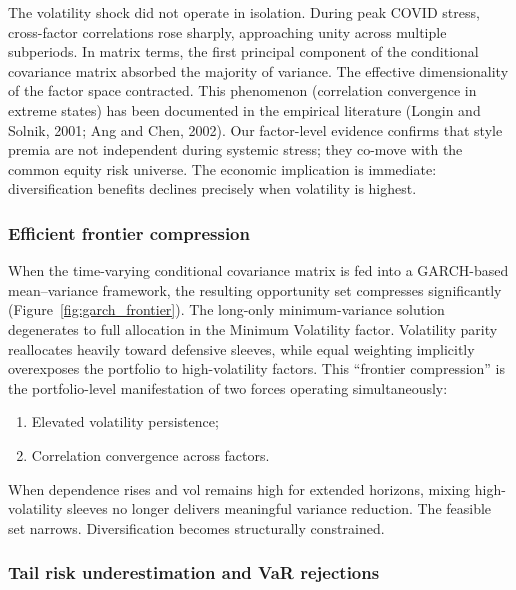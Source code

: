 \documentclass{article}
\begin{document}
The volatility shock did not operate in isolation. During peak COVID stress, cross-factor correlations rose sharply, approaching unity across multiple subperiods. In matrix terms, the first principal component of the conditional covariance matrix absorbed the majority of variance. The effective dimensionality of the factor space contracted. This phenomenon (correlation convergence in extreme states) has been documented in the empirical literature (Longin and Solnik, 2001; Ang and Chen, 2002). Our factor-level evidence confirms that style premia are not independent during systemic stress; they co-move with the common equity risk universe. The economic implication is immediate: diversification benefits declines precisely when volatility is highest.\newline

\subsubsection{Efficient frontier compression}

When the time-varying conditional covariance matrix is fed into a GARCH-based mean–variance framework, the resulting opportunity set compresses significantly (Figure~\ref{fig:garch_frontier}). The long-only minimum-variance solution degenerates to full allocation in the Minimum Volatility factor. Volatility parity reallocates heavily toward defensive sleeves, while equal weighting implicitly overexposes the portfolio to high-volatility factors. This “frontier compression” is the portfolio-level manifestation of two forces operating simultaneously:\newline

\begin{enumerate}
\item Elevated volatility persistence;
\item Correlation convergence across factors.
\end{enumerate}

When dependence rises and vol remains high for extended horizons, mixing high-volatility sleeves no longer delivers meaningful variance reduction. The feasible set narrows. Diversification becomes structurally constrained.\newline

\subsubsection{Tail risk underestimation and VaR rejections}
\end{document}
